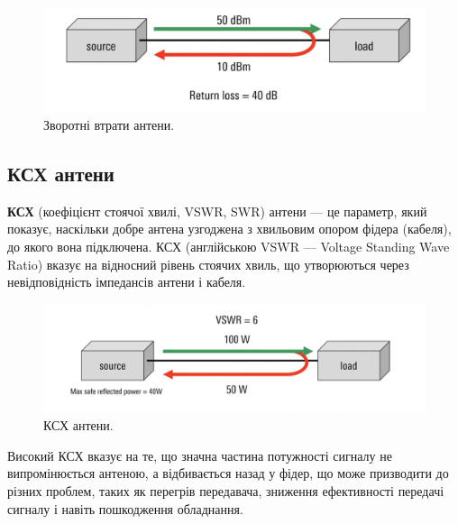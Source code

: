 \documentclass{article}
\begin{document}
\begin{figure}[H]
\centering
\includegraphics[width=0.75\linewidth]{images/return-loss.png}
\caption{\label{fig:return-loss}Зворотні втрати антени.}
\end{figure}

\subsection{КСХ антени}
\textbf{КСХ} (коефіцієнт стоячої хвилі, VSWR, SWR) антени — це параметр, який показує, наскільки добре антена узгоджена з хвильовим опором фідера (кабеля), до якого вона підключена. КСХ (англійською VSWR — Voltage Standing Wave Ratio) вказує на відносний рівень стоячих хвиль, що утворюються через невідповідність імпедансів антени і кабеля.

\begin{figure}[H]
\centering
\includegraphics[width=0.75\linewidth]{images/swr.png}
\caption{\label{fig:swr}КСХ антени.}
\end{figure}

Високий КСХ вказує на те, що значна частина потужності сигналу не випромінюється антеною, а відбивається назад у фідер, що може призводити до різних проблем, таких як перегрів передавача, зниження ефективності передачі сигналу і навіть пошкодження обладнання.
\end{document}
